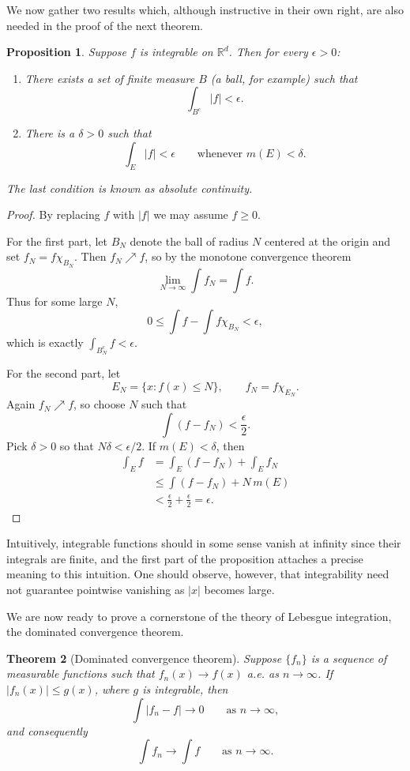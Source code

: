 \documentclass[11pt,openany]{book}
\newtheorem{theorem}{Theorem}[section]
\newtheorem{proposition}[theorem]{Proposition}
\begin{document}
We now gather two results which, although instructive in their own right, are also needed in the proof of the next theorem.

\begin{proposition}
Suppose $f$ is integrable on $\mathbb{R}^d$. Then for every $\epsilon>0$:
\begin{enumerate}
\item[(i)] There exists a set of finite measure $B$ (a ball, for example) such that
\[
\int_{B^c}|f|<\epsilon.
\]
\item[(ii)] There is a $\delta>0$ such that
\[
\int_E|f|<\epsilon\qquad\text{whenever }m(E)<\delta.
\]
\end{enumerate}
The last condition is known as absolute continuity.
\end{proposition}

\begin{proof}
By replacing $f$ with $|f|$ we may assume $f\geq0$.

For the first part, let $B_N$ denote the ball of radius $N$ centered at the origin and set $f_N=f\chi_{B_N}$. Then $f_N\nearrow f$, so by the monotone convergence theorem
\[
\lim_{N\to\infty}\int f_N=\int f.
\]
Thus for some large $N$,
\[
0\leq\int f-\int f\chi_{B_N}<\epsilon,
\]
which is exactly $\int_{B_N^c}f<\epsilon$.

For the second part, let
\[
E_N=\{x:f(x)\leq N\},
\qquad
f_N=f\chi_{E_N}.
\]
Again $f_N\nearrow f$, so choose $N$ such that
\[
\int(f-f_N)<\frac{\epsilon}{2}.
\]
Pick $\delta>0$ so that $N\delta<\epsilon/2$. If $m(E)<\delta$, then
\begin{align*}
\int_Ef
&=\int_E(f-f_N)+\int_Ef_N\\
&\leq\int(f-f_N)+N\,m(E)\\
&<\frac{\epsilon}{2}+\frac{\epsilon}{2}=\epsilon.
\end{align*}
\end{proof}

Intuitively, integrable functions should in some sense vanish at infinity since their integrals are finite, and the first part of the proposition attaches a precise meaning to this intuition. One should observe, however, that integrability need not guarantee pointwise vanishing as $|x|$ becomes large.

We are now ready to prove a cornerstone of the theory of Lebesgue integration, the dominated convergence theorem.

\begin{theorem}[Dominated convergence theorem]
Suppose $\{f_n\}$ is a sequence of measurable functions such that $f_n(x)\to f(x)$ a.e. as $n\to\infty$. If $|f_n(x)|\leq g(x)$, where $g$ is integrable, then
\[
\int|f_n-f|\to0\qquad\text{as }n\to\infty,
\]
and consequently
\[
\int f_n\to\int f\qquad\text{as }n\to\infty.
\]
\end{theorem}
\end{document}
